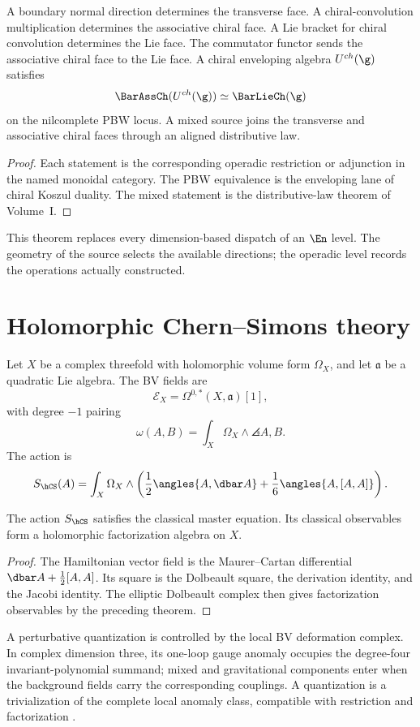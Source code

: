 \begin{theorem}
A boundary normal direction determines the transverse face.  A chiral-convolution multiplication determines the associative chiral face.  A Lie bracket for chiral convolution determines the Lie face.  The commutator functor sends the associative chiral face to the Lie face.  A chiral enveloping algebra $U^{\ch}(\g)$ satisfies
\[
 \BarAssCh(U^{\ch}(\g))\simeq\BarLieCh(\g)
\]
on the nilcomplete PBW locus.  A mixed source joins the transverse and associative chiral faces through an aligned distributive law.
\end{theorem}
\begin{proof}
Each statement is the corresponding operadic restriction or adjunction in the named monoidal category.  The PBW equivalence is the enveloping lane of chiral Koszul duality.  The mixed statement is the distributive-law theorem of Volume~I.
\end{proof}

This theorem replaces every dimension-based dispatch of an $\En$ level.  The geometry of the source selects the available directions; the operadic level records the operations actually constructed.

\chapter{Holomorphic Chern--Simons theory}
Let $X$ be a complex threefold with holomorphic volume form $\Omega_X$, and let $\mathfrak a$ be a quadratic Lie algebra. The BV fields are
\[
 \mathcal E_X=\Omega^{0,*}(X,\mathfrak a)[1],
\]
with degree $-1$ pairing
\[
 \omega(A,B)=\int_X\Omega_X\wedge\angles{A,B}.
\]
The action is
\[
 S_{\hCS}(A)=\int_X\Omega_X\wedge
 \left(\frac12\angles{A,\dbar A}+\frac16\angles{A,[A,A]}\right).
\]

\begin{theorem}
The action $S_{\hCS}$ satisfies the classical master equation. Its classical observables form a holomorphic factorization algebra on $X$.
\end{theorem}
\begin{proof}
The Hamiltonian vector field is the Maurer--Cartan differential $\dbar A+\frac12[A,A]$. Its square is the Dolbeault square, the derivation identity, and the Jacobi identity. The elliptic Dolbeault complex then gives factorization observables by the preceding theorem.
\end{proof}

A perturbative quantization is controlled by the local BV deformation complex. In complex dimension three, its one-loop gauge anomaly occupies the degree-four invariant-polynomial summand; mixed and gravitational components enter when the background fields carry the corresponding couplings. A quantization is a trivialization of the complete local anomaly class, compatible with restriction and factorization \cite{CostelloLiAnomaly}.

